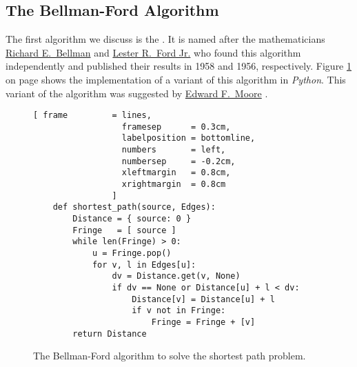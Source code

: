 \subsection{The Bellman-Ford Algorithm}
The first algorithm we discuss is the
\href{https://en.wikipedia.org/wiki/Bellman-Ford_algorithm}{}.
It is named after the mathematicians 
\href{https://en.wikipedia.org/wiki/Richard_E._Bellman}{Richard E.~Bellman} \cite{bellman:58} and 
\href{https://en.wikipedia.org/wiki/L._R._Ford_Jr.}{Lester R.~Ford Jr.} \cite{ford:56} who found this algorithm
independently and published their results in 1958 and 1956, respectively.  Figure
\ref{fig:Moore.ipynb} on page \pageref{fig:Moore.ipynb} shows the implementation of a variant of this 
algorithm in \textsl{Python}.  This variant of the algorithm was suggested by 
\href{https://en.wikipedia.org/wiki/Edward_F._Moore}{Edward F.~Moore} \cite{moore:59}.


\begin{figure}[!ht]
  \centering
\begin{Verbatim}[ frame         = lines, 
                  framesep      = 0.3cm, 
                  labelposition = bottomline,
                  numbers       = left,
                  numbersep     = -0.2cm,
                  xleftmargin   = 0.8cm,
                  xrightmargin  = 0.8cm
                ]
    def shortest_path(source, Edges):
        Distance = { source: 0 }
        Fringe   = [ source ]
        while len(Fringe) > 0:
            u = Fringe.pop()
            for v, l in Edges[u]:
                dv = Distance.get(v, None)
                if dv == None or Distance[u] + l < dv:
                    Distance[v] = Distance[u] + l
                    if v not in Fringe: 
                        Fringe = Fringe + [v] 
        return Distance
\end{Verbatim}
\vspace*{-0.3cm}
  \caption{The Bellman-Ford algorithm to solve the shortest path problem.}
  \label{fig:Moore.ipynb}
\end{figure} 


